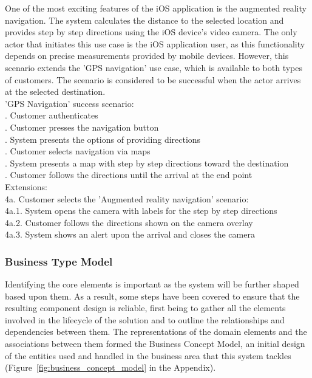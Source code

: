 One of the most exciting features of the iOS application is the augmented reality navigation. The system calculates the distance to the selected location and provides step by step directions using the iOS device's video camera. The only actor that initiates this use case is the iOS application user, as this functionality depends on precise measurements provided by mobile devices. However, this scenario extends the 'GPS navigation' use case, which is available to both types of customers. The scenario is considered to be successful when the actor arrives at the selected destination.\\

\indent 'GPS Navigation' success scenario:\\
. Customer authenticates\\
. Customer presses the navigation button\\
. System presents the options of providing directions\\
. Customer selects navigation via maps\\
. System presents a map with step by step directions toward the destination\\
. Customer follows the directions until the arrival at the end point\\
Extensions:\\
\indent 4a. Customer selects the 'Augmented reality navigation' scenario:\\
\indent\indent 4a.1. System opens the camera with labels for the step by step directions\\
\indent\indent  4a.2. Customer follows the directions shown on the camera overlay\\
\indent\indent  4a.3. System shows an alert upon the arrival and closes the camera

\subsubsection{Business Type Model}

Identifying the core elements is important as the system will be further shaped based upon them. As a result, some steps have been covered to ensure that the resulting component design is reliable, first being to gather all the elements involved in the lifecycle of the solution and to outline the relationships and dependencies between them. The representations of the domain elements and the associations between them formed the Business Concept Model, an initial design of the entities used and handled in the business area that this system tackles (Figure~\ref{fig:business_concept_model} in the Appendix).\\


